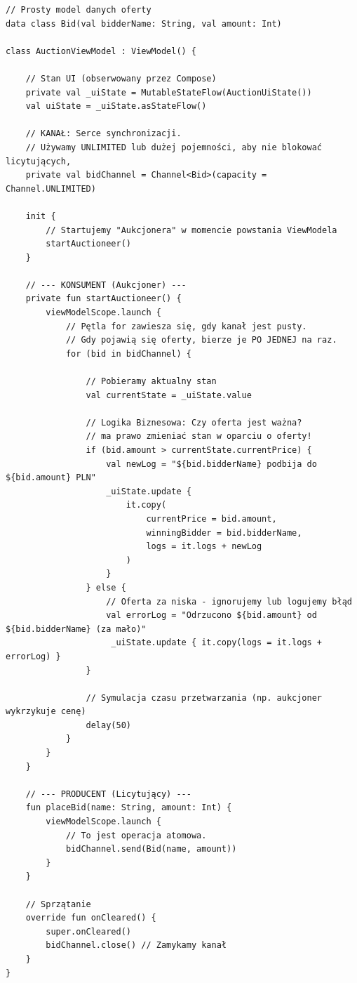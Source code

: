 \begin{verbatim}
// Prosty model danych oferty
data class Bid(val bidderName: String, val amount: Int)

class AuctionViewModel : ViewModel() {

    // Stan UI (obserwowany przez Compose)
    private val _uiState = MutableStateFlow(AuctionUiState())
    val uiState = _uiState.asStateFlow()

    // KANAŁ: Serce synchronizacji.
    // Używamy UNLIMITED lub dużej pojemności, aby nie blokować licytujących,
    private val bidChannel = Channel<Bid>(capacity = Channel.UNLIMITED)

    init {
        // Startujemy "Aukcjonera" w momencie powstania ViewModela
        startAuctioneer()
    }

    // --- KONSUMENT (Aukcjoner) ---
    private fun startAuctioneer() {
        viewModelScope.launch {
            // Pętla for zawiesza się, gdy kanał jest pusty.
            // Gdy pojawią się oferty, bierze je PO JEDNEJ na raz.
            for (bid in bidChannel) {
                
                // Pobieramy aktualny stan
                val currentState = _uiState.value
                
                // Logika Biznesowa: Czy oferta jest ważna?
                // ma prawo zmieniać stan w oparciu o oferty!
                if (bid.amount > currentState.currentPrice) {
                    val newLog = "${bid.bidderName} podbija do ${bid.amount} PLN"
                    _uiState.update { 
                        it.copy(
                            currentPrice = bid.amount, 
                            winningBidder = bid.bidderName,
                            logs = it.logs + newLog
                        ) 
                    }
                } else {
                    // Oferta za niska - ignorujemy lub logujemy błąd
                    val errorLog = "Odrzucono ${bid.amount} od ${bid.bidderName} (za mało)"
                     _uiState.update { it.copy(logs = it.logs + errorLog) }
                }
                
                // Symulacja czasu przetwarzania (np. aukcjoner wykrzykuje cenę)
                delay(50) 
            }
        }
    }

    // --- PRODUCENT (Licytujący) ---
    fun placeBid(name: String, amount: Int) {
        viewModelScope.launch {
            // To jest operacja atomowa.
            bidChannel.send(Bid(name, amount))
        }
    }
    
    // Sprzątanie
    override fun onCleared() {
        super.onCleared()
        bidChannel.close() // Zamykamy kanał
    }
}
\end{verbatim}

